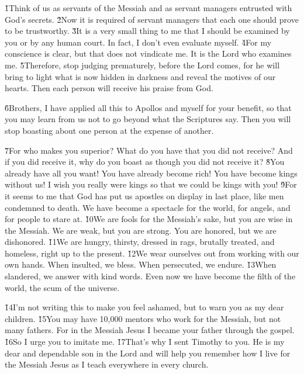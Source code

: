 \v{1}Think of us as servants of the Messiah and as servant managers entrusted with God's secrets. \v{2}Now it is required of servant managers that each one should prove to be trustworthy. \v{3}It is a very small thing to me that I should be examined by you or by any human court. In fact, I don't even evaluate myself. \v{4}For my conscience is clear, but that does not vindicate me. It is the Lord who examines me. \v{5}Therefore, stop judging prematurely, before the Lord comes, for he will bring to light what is now hidden in darkness and reveal the motives of our hearts. Then each person will receive his praise from God.

\v{6}Brothers, I have applied all this to Apollos and myself for your benefit, so that you may learn from us not to go beyond what the Scriptures say. Then you will stop boasting about one person at the expense of another.

\v{7}For who makes you superior? What do you have that you did not receive? And if you did receive it, why do you boast as though you did not receive it? \v{8}You already have all you want! You have already become rich! You have become kings without us! I wish you really were kings so that we could be kings with you! \v{9}For it seems to me that God has put us apostles on display in last place, like men condemned to death. We have become a spectacle for the world, for angels, and for people to stare at. \v{10}We are fools for the Messiah's sake, but you are wise in the Messiah. We are weak, but you are strong. You are honored, but we are dishonored. \v{11}We are hungry, thirsty, dressed in rags, brutally treated, and homeless, right up to the present. \v{12}We wear ourselves out from working with our own hands. When insulted, we bless. When persecuted, we endure. \v{13}When slandered, we answer with kind words. Even now we have become the filth of the world, the scum of the universe.

\v{14}I'm not writing this to make you feel ashamed, but to warn you as my dear children. \v{15}You may have 10,000 mentors who work for the Messiah, but not many fathers. For in the Messiah Jesus I became your father through the gospel. \v{16}So I urge you to imitate me. \v{17}That's why I sent Timothy to you. He is my dear and dependable son in the Lord and will help you remember how I live for the Messiah Jesus as I teach everywhere in every church.


